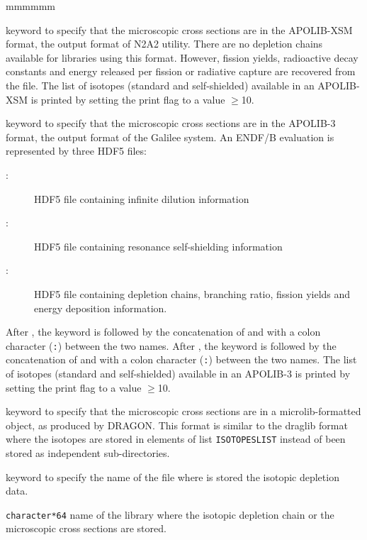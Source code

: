 \begin{ListeDeDescription}{mmmmmm}
\item[\moc{APXSM}] keyword to specify that the microscopic cross sections are
in the APOLIB-XSM format, the output format of N2A2 utility. There are no depletion chains available for libraries
using this format. However, fission yields, radioactive decay constants and
energy released per fission or radiative capture are recovered from the file.
The list of isotopes (standard and self-shielded) available in an APOLIB-XSM
is printed by setting the print flag to a value $\ge$10.

\item[\moc{APLIB3}] keyword to specify that the microscopic cross sections are
in the APOLIB-3 format, the output format of the Galilee system. An ENDF/B evaluation is
represented by three HDF5 files:
\begin{description}
\item[:] HDF5 file containing infinite dilution information
\item[:] HDF5 file containing resonance self-shielding information
\item[:] HDF5 file containing depletion chains, branching ratio, fission yields and energy deposition information.
\end{description}
After , the  keyword is followed by the concatenation of  and  with a colon character ({\tt :}) between
the two names. After , the  keyword is followed by the concatenation of  and  with a colon character ({\tt :}) between
the two names. The list of isotopes (standard and self-shielded) available in an APOLIB-3
is printed by setting the print flag to a value $\ge$10.

\item[\moc{MICROLIB}] keyword to specify that the microscopic cross sections are
in a {\sc microlib}-formatted object, as produced by DRAGON. This format is similar to the {\sc draglib}
format where the isotopes are stored in elements of list {\tt ISOTOPESLIST} instead of been stored
as independent sub-directories.

\item[\moc{FIL:}] keyword to specify the name of the file where is stored the
isotopic depletion data. 

\item[\dusa{NAMEFIL}] {\tt character*64} name of the library
where the isotopic depletion chain or the microscopic cross sections are stored.


\end{ListeDeDescription}
